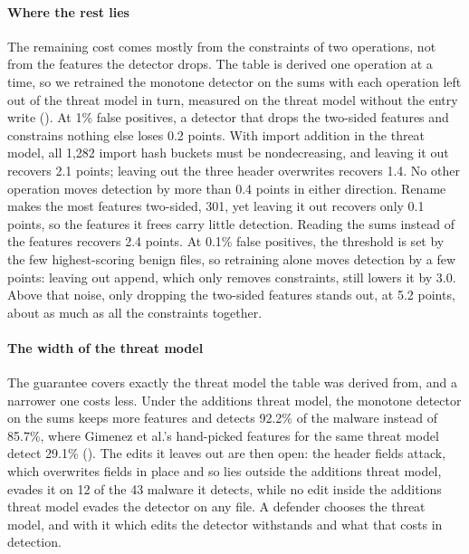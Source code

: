 \paragraph{Where the rest lies}
The remaining cost comes mostly from the constraints of two operations, not from the features the detector drops. The
table is derived one operation at a time, so we retrained the monotone detector on the sums with each operation left
out of the threat model in turn, measured on the threat model without the entry write (). At 1\%
false positives, a detector that drops the two-sided features and constrains nothing else loses 0.2 points. With import
addition in the threat model, all 1,282 import hash buckets must be nondecreasing, and leaving it out recovers 2.1
points; leaving out the three header overwrites recovers 1.4. No other operation moves detection by more than 0.4
points in either direction. Rename makes the most features two-sided, 301, yet leaving it out recovers only 0.1
points, so the features it frees carry little detection. Reading the sums instead of the features recovers 2.4
points. At 0.1\% false positives, the threshold is set by the few highest-scoring benign files, so retraining alone
moves detection by a few points: leaving out append, which only removes constraints, still lowers it by 3.0. Above that
noise, only dropping the two-sided features stands out, at 5.2 points, about as much as all the constraints together.

\paragraph{The width of the threat model}
The guarantee covers exactly the threat model the table was derived from, and a narrower one costs less. Under the
additions threat model, the monotone detector on the sums keeps more features and detects 92.2\% of the malware
instead of 85.7\%, where Gimenez et al.'s hand-picked features for the same threat model detect 29.1\%
(). The edits it leaves out are then open: the header fields attack, which overwrites fields in
place and so lies outside the additions threat model, evades it on 12 of the 43 malware it detects, while no edit
inside the additions threat model evades the detector on any file. A defender chooses the threat model, and with it
which edits the detector withstands and what that costs in detection.

